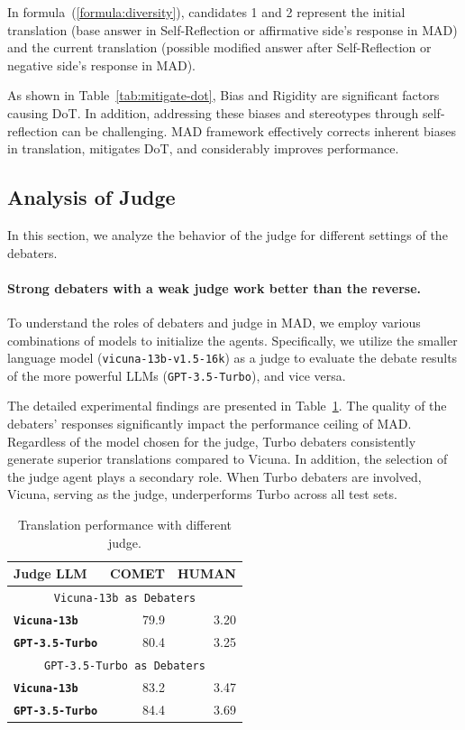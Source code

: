 In formula~(\ref{formula:diversity}), candidates 1 and 2 represent the initial translation (base answer in Self-Reflection or affirmative side's response in MAD) and the current translation (possible modified answer after Self-Reflection or negative side's response in MAD).

As shown in Table~\ref{tab:mitigate-dot}, 
Bias and Rigidity are significant factors causing DoT. In addition, addressing these biases and stereotypes through self-reflection can be challenging. MAD framework effectively corrects inherent biases in translation, mitigates DoT, and considerably improves performance.

\subsection{Analysis of Judge}

In this section, we analyze the behavior of the judge for different settings of the debaters. 


\paragraph{Strong debaters with a weak judge work better than the reverse.}
To understand the roles of debaters and judge in MAD, we employ various combinations of models to initialize the agents. Specifically, we utilize the smaller language model (\texttt{vicuna-13b-v1.5-16k}) as a judge to evaluate the debate results of the more powerful LLMs (\texttt{GPT-3.5-Turbo}), and vice versa. 

The detailed experimental findings are presented in Table~\ref{tab:weak-judge}. The quality of the debaters' responses significantly impact the performance ceiling of MAD. Regardless of the model chosen for the judge, Turbo debaters consistently generate superior translations compared to Vicuna. In addition, the selection of the judge agent plays a secondary role. When Turbo debaters are involved, Vicuna, serving as the judge, underperforms Turbo across all test sets.

\begin{table}[t]
\centering
\begin{tabular}{l rr}
\toprule
\bf Judge LLM & \bf COMET & \bf HUMAN \\
\midrule
\multicolumn{3}{c}{\texttt{Vicuna-13b as Debaters}} \\
{\bf \texttt{Vicuna-13b}}  & 79.9 & 3.20 \\
{\bf \texttt{GPT-3.5-Turbo}}   & 80.4 & 3.25 \\
\midrule
\multicolumn{3}{c}{\texttt{GPT-3.5-Turbo as Debaters}} \\
{\bf \texttt{Vicuna-13b}}  & 83.2 & 3.47 \\
{\bf \texttt{GPT-3.5-Turbo}}   & 84.4 & 3.69 \\
\bottomrule
\end{tabular}
\vspace{-5pt}
\caption{Translation performance with different judge.}
\label{tab:weak-judge}
\end{table}


